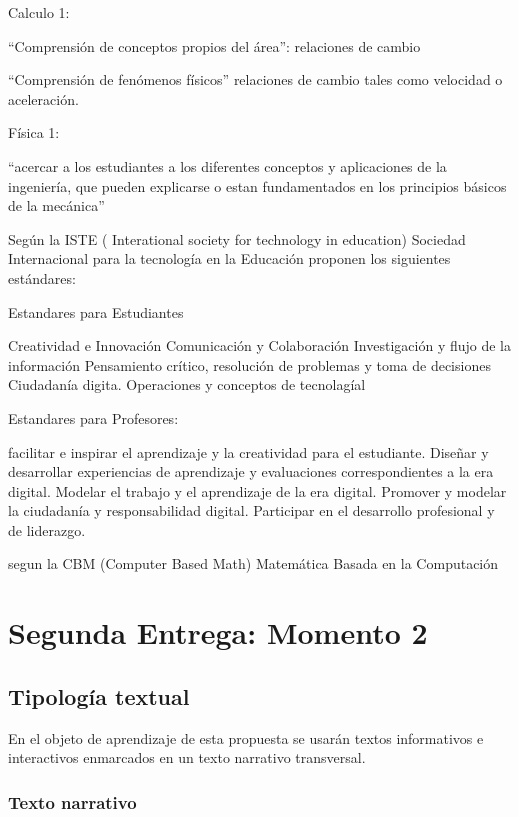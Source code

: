 \documentclass[twoside,letterpaper,11pt]{report}
\begin{document}
Calculo 1:

“Comprensión de conceptos propios del área”: 
relaciones de  cambio

“Comprensión de fenómenos físicos”
	relaciones de cambio tales como velocidad o aceleración.

 
Física 1:
 
“acercar a los estudiantes a los diferentes conceptos y aplicaciones de la ingeniería, que pueden explicarse o estan fundamentados en los principios básicos de la mecánica”


Según la ISTE ( Interational society for technology in education) Sociedad Internacional para la tecnología en la Educación proponen los siguientes estándares:

Estandares para Estudiantes

Creatividad e Innovación
Comunicación y Colaboración
Investigación y flujo de la información
Pensamiento crítico, resolución de problemas y toma de decisiones
Ciudadanía digita.
Operaciones y conceptos de tecnolagíal

Estandares para Profesores: 

facilitar e inspirar el aprendizaje y la creatividad para el estudiante.
Diseñar y desarrollar experiencias de aprendizaje y evaluaciones correspondientes a la era digital.
Modelar el trabajo y el aprendizaje de la era digital.
Promover y modelar la ciudadanía y responsabilidad digital.
Participar en el desarrollo profesional y de liderazgo.



segun la CBM   (Computer Based Math) Matemática Basada en la Computación


\chapter{Segunda Entrega: Momento 2}

\section{Tipología textual}

En el objeto de aprendizaje de esta propuesta se usarán textos informativos e interactivos enmarcados en un texto narrativo transversal.

\subsection{Texto narrativo} %
\label{sub:texto_narrativo}
\end{document}

